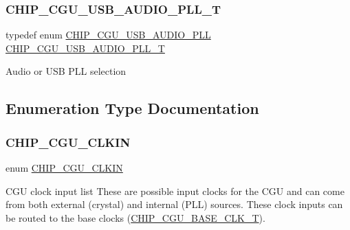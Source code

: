 \subsubsection{\texorpdfstring{C\+H\+I\+P\+\_\+\+C\+G\+U\+\_\+\+U\+S\+B\+\_\+\+A\+U\+D\+I\+O\+\_\+\+P\+L\+L\+\_\+T}{CHIP\_CGU\_USB\_AUDIO\_PLL\_T}}
{\footnotesize\ttfamily typedef enum \hyperlink{group___c_l_o_c_k__18_x_x__43_x_x_gabdd04536f16b3c7b588757d024e53da6}{C\+H\+I\+P\+\_\+\+C\+G\+U\+\_\+\+U\+S\+B\+\_\+\+A\+U\+D\+I\+O\+\_\+\+P\+LL}  \hyperlink{group___c_l_o_c_k__18_x_x__43_x_x_ga839a458a9e1e2a85e68470156c861e6a}{C\+H\+I\+P\+\_\+\+C\+G\+U\+\_\+\+U\+S\+B\+\_\+\+A\+U\+D\+I\+O\+\_\+\+P\+L\+L\+\_\+T}}

Audio or U\+SB P\+LL selection 

\subsection{Enumeration Type Documentation}
\mbox{\label{group___c_l_o_c_k__18_x_x__43_x_x_ga419aa2b9970dcf4930eb44871da9e377}} 
\subsubsection{\texorpdfstring{C\+H\+I\+P\+\_\+\+C\+G\+U\+\_\+\+C\+L\+K\+IN}{CHIP\_CGU\_CLKIN}}
{\footnotesize\ttfamily enum \hyperlink{group___c_l_o_c_k__18_x_x__43_x_x_ga419aa2b9970dcf4930eb44871da9e377}{C\+H\+I\+P\+\_\+\+C\+G\+U\+\_\+\+C\+L\+K\+IN}}



C\+GU clock input list These are possible input clocks for the C\+GU and can come from both external (crystal) and internal (P\+LL) sources. These clock inputs can be routed to the base clocks (\hyperlink{chip__clocks_8h_a31e266dd83cc66eb866d8d051ffd1d45}{C\+H\+I\+P\+\_\+\+C\+G\+U\+\_\+\+B\+A\+S\+E\+\_\+\+C\+L\+K\+\_\+T}). 

